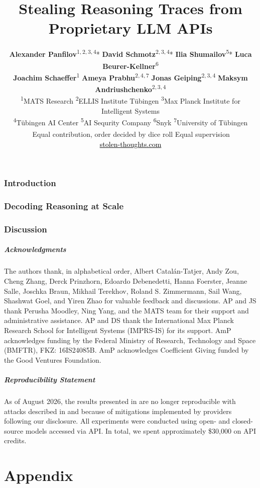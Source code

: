 \documentclass[oneside, a4paper, onecolumn, 10pt]{article}
\title{Stealing Reasoning Traces from Proprietary LLM APIs}
\author{\vspace{-0.2cm}
\normalsize \textbf{Alexander Panfilov}\textsuperscript{1,\,2,\,3,\,4}* \quad \textbf{David Schmotz}\textsuperscript{2,\,3,\,4}*  \quad \textbf{Ilia Shumailov}\textsuperscript{5}* \quad \textbf{Luca Beurer-Kellner}\textsuperscript{6}\\[2.5mm]
\normalsize \textbf{Joachim Schaeffer}\textsuperscript{1} \quad  \textbf{Ameya Prabhu}\textsuperscript{2,\,4,\,7\textdaggerdbl} \quad \textbf{Jonas Geiping}\textsuperscript{2,\,3,\,4\textdaggerdbl} \quad \textbf{Maksym Andriushchenko}\textsuperscript{2,\,3,\,4\textdaggerdbl}\\[2.5mm]
\small \textsuperscript{1}MATS Research \qquad \textsuperscript{2}ELLIS Institute T\"ubingen \qquad \textsuperscript{3}Max Planck Institute for Intelligent Systems\\[0mm]
\small \textsuperscript{4}T\"ubingen AI Center \qquad \textsuperscript{5}AI Sequrity Company \qquad \textsuperscript{6}Snyk \qquad \textsuperscript{7}University of T\"ubingen\\[2mm]
\small *\,Equal contribution, order decided by dice roll \qquad \textsuperscript{\textdaggerdbl}Equal supervision\\[4mm]
\small \href{https://stolen-thoughts.com}{\textcolor{black}{{\footnotesize\faGlobe}\hspace{0.45em}stolen-thoughts.com}}
}
\date{}
\begin{document}
\maketitle
\vspace{-.7cm}
\begin{abstract}

\end{abstract}

\section{Introduction}
\label{sec:summary}


\section{Decoding Reasoning at Scale}
\label{sec:vulnerability}




\section{Discussion}
\label{sec:discussion}


\clearpage

\subsubsection*{Acknowledgments}
\vspace{-.1cm}
The authors thank, in alphabetical order, Albert Catalán-Tatjer, Andy Zou, Cheng Zhang, Derck Prinzhorn, Edoardo Debenedetti, Hanna Foerster, Jeanne Salle, Joschka Braun, Mikhail Terekhov, Roland S. Zimmermann, Sail Wang, Shashwat Goel, and Yiren Zhao for valuable feedback and discussions. AP and JS thank Perusha Moodley, Ning Yang, and the MATS team for their support and administrative assistance. AP and DS thank the International Max Planck Research School for Intelligent Systems (IMPRS-IS) for its support. AmP acknowledges funding by the Federal Ministry of Research, Technology and Space (BMFTR), FKZ: 16IS24085B. AmP acknowledges Coefficient Giving funded by the Good Ventures Foundation.

\subsubsection*{Reproducibility Statement}
\vspace{-.1cm}
As of August 2026, the results presented in  are no longer reproducible with attacks described in  and  because of mitigations implemented by providers following our disclosure. All experiments were conducted using open- and closed- source models accessed via API. In total, we spent approximately \$30,000 on API credits.
{\small


}

\newpage
\appendix
{}

\setcounter{secnumdepth}{-2}
\part{Appendix}
\setcounter{secnumdepth}{3}
\localtableofcontents
\clearpage


\end{document}
